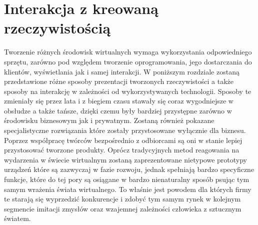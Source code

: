 \chapter{Interakcja z kreowaną rzeczywistością}
\label{ch:prezentacja}
 Tworzenie różnych środowisk wirtualnych wymaga wykorzystania odpowiedniego sprzętu, zarówno pod względem tworzenie oprogramowania, jego dostarczania do klientów, wyświetlania jak i samej interakcji. W poniższym rozdziale zostaną przedstawione różne sposoby prezentacji tworzonych rzeczywistości a także sposoby na interakcję w zależności od wykorzystywanych technologii. Sposoby te zmieniały się przez lata i z biegiem czasu stawały się coraz wygodniejsze w obsłudze a także tańsze, dzięki czemu były bardziej przystępne zarówno w środowisku biznesowym jak i prywatnym. Zostaną również pokazane specjalistyczne rozwiązania które zostały przystosowane wyłącznie dla biznesu. Poprzez współpracę twórców bezpośrednio z odbiorcami są oni w stanie lepiej przystosować tworzone produkty. Oprócz tradycyjnych metod reagowania na wydarzenia w świecie wirtualnym zostaną zaprezentowane nietypowe prototypy urządzeń które są zazwyczaj w fazie rozwoju, jednak spełniają bardzo specyficzne funkcje, które do tej pory są osiągane w bardzo nienaturalny sposób psując tym samym wrażenia świata wirtualnego. To właśnie jest powodem dla których firmy te starają się wyprzedzić konkurencje i zdobyć tym samym rynek w kolejnym segmencie imitacji zmysłów oraz wzajemnej zależności człowieka z sztucznym światem. 

